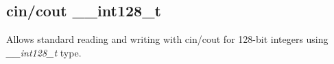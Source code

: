 \subsection{cin/cout \_\_int128\_t}

Allows standard reading and writing with cin/cout for 128-bit integers using \textit{\_\_int128\_t} type.
